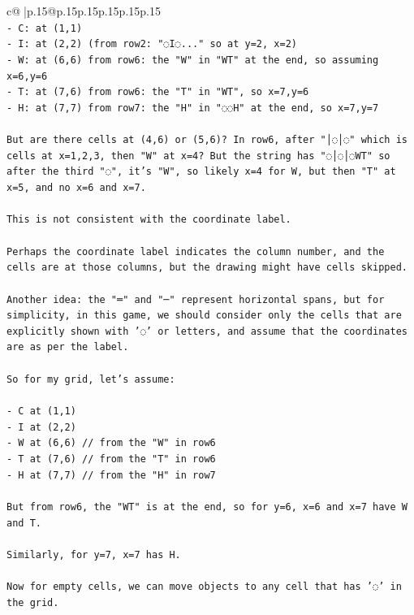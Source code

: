 \documentclass{article}
\begin{document}
{\begin{supertabular}{c@{$\;$}|p{.15\linewidth}@{}p{.15\linewidth}p{.15\linewidth}p{.15\linewidth}p{.15\linewidth}p{.15\linewidth}}
{{{\\ 
\texttt{{-} C: at (1,1)} \\
\texttt{{-} I: at (2,2)  (from row2: "◌I◌..." so at y=2, x=2)} \\
\texttt{{-} W: at (6,6) from row6: the "W" in "WT" at the end, so assuming x=6,y=6} \\
\texttt{{-} T: at (7,6) from row6: the "T" in "WT", so x=7,y=6} \\
\texttt{{-} H: at (7,7) from row7: the "H" in "◌◌H" at the end, so x=7,y=7} \\
\\ 
\texttt{But are there cells at (4,6) or (5,6)? In row6, after "│◌│◌" which is cells at x=1,2,3, then "W" at x=4? But the string has "◌│◌│◌WT" so after the third "◌", it's "W", so likely x=4 for W, but then "T" at x=5, and no x=6 and x=7.} \\
\\ 
\texttt{This is not consistent with the coordinate label.} \\
\\ 
\texttt{Perhaps the coordinate label indicates the column number, and the cells are at those columns, but the drawing might have cells skipped.} \\
\\ 
\texttt{Another idea: the "═" and "─" represent horizontal spans, but for simplicity, in this game, we should consider only the cells that are explicitly shown with '◌' or letters, and assume that the coordinates are as per the label.} \\
\\ 
\texttt{So for my grid, let's assume:} \\
\\ 
\texttt{{-} C at (1,1)} \\
\texttt{{-} I at (2,2)} \\
\texttt{{-} W at (6,6)  // from the "W" in row6} \\
\texttt{{-} T at (7,6)  // from the "T" in row6} \\
\texttt{{-} H at (7,7)  // from the "H" in row7} \\
\\ 
\texttt{But from row6, the "WT" is at the end, so for y=6, x=6 and x=7 have W and T.} \\
\\ 
\texttt{Similarly, for y=7, x=7 has H.} \\
\\ 
\texttt{Now for empty cells, we can move objects to any cell that has '◌' in the grid.} \\
}}}
\end{supertabular}}
\end{document}
